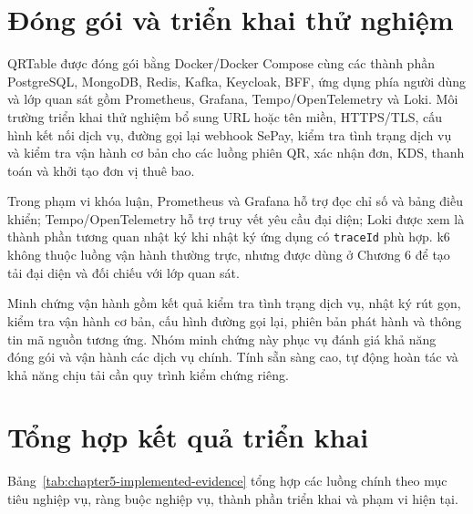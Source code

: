 
\section{Đóng gói và triển khai thử nghiệm}

QRTable được đóng gói bằng Docker/Docker Compose cùng các thành phần PostgreSQL, MongoDB, Redis, Kafka, Keycloak, BFF, ứng dụng phía người dùng và lớp quan sát gồm Prometheus, Grafana, Tempo/OpenTelemetry và Loki. Môi trường triển khai thử nghiệm bổ sung URL hoặc tên miền, HTTPS/TLS, cấu hình kết nối dịch vụ, đường gọi lại webhook SePay, kiểm tra tình trạng dịch vụ và kiểm tra vận hành cơ bản cho các luồng phiên QR, xác nhận đơn, KDS, thanh toán và khởi tạo đơn vị thuê bao.

Trong phạm vi khóa luận, Prometheus và Grafana hỗ trợ đọc chỉ số và bảng điều khiển; Tempo/OpenTelemetry hỗ trợ truy vết yêu cầu đại diện; Loki được xem là thành phần tương quan nhật ký khi nhật ký ứng dụng có \texttt{traceId} phù hợp. k6 không thuộc luồng vận hành thường trực, nhưng được dùng ở Chương 6 để tạo tải đại diện và đối chiếu với lớp quan sát.

Minh chứng vận hành gồm kết quả kiểm tra tình trạng dịch vụ, nhật ký rút gọn, kiểm tra vận hành cơ bản, cấu hình đường gọi lại, phiên bản phát hành và thông tin mã nguồn tương ứng. Nhóm minh chứng này phục vụ đánh giá khả năng đóng gói và vận hành các dịch vụ chính. Tính sẵn sàng cao, tự động hoàn tác và khả năng chịu tải cần quy trình kiểm chứng riêng.

\section{Tổng hợp kết quả triển khai}

Bảng~\ref{tab:chapter5-implemented-evidence} tổng hợp các luồng chính theo mục tiêu nghiệp vụ, ràng buộc nghiệp vụ, thành phần triển khai và phạm vi hiện tại.

